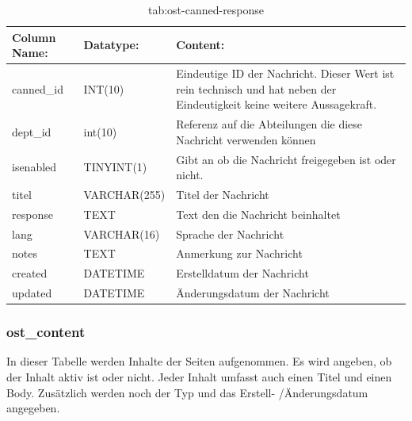 \begin{table}[h]
	\begin{tabular}{|p{3.5cm}|p{4cm}|p{6.2cm}|}
		\hline
		\textbf{Column Name:} & \textbf{Datatype:} & \textbf{Content:}\\
		\hline
		canned\_id & INT(10) & Eindeutige ID der Nachricht. Dieser Wert ist rein technisch und hat neben der Eindeutigkeit keine weitere 
		Aussagekraft.\\
		\hline
		dept\_id & int(10) & Referenz auf die Abteilungen die diese Nachricht verwenden können\\
		\hline
		isenabled & TINYINT(1) & Gibt an ob die Nachricht freigegeben ist oder nicht.\\
		\hline
		titel & VARCHAR(255) & Titel der Nachricht\\
		\hline
		response & TEXT & Text den die Nachricht beinhaltet\\
		\hline
		lang & VARCHAR(16) & Sprache der Nachricht\\
		\hline
		notes & TEXT & Anmerkung zur Nachricht\\
		\hline
		created & DATETIME & Erstelldatum der Nachricht\\
		\hline
		updated & DATETIME & Änderungsdatum der Nachricht\\
		\hline
	\end{tabular}
	\caption{tab:ost-canned-response}
\end{table}
\label{tab:ost_canned_response}

\newpage

\subsubsection{ost\_content}

In dieser Tabelle werden Inhalte der Seiten aufgenommen. Es wird angeben, ob der Inhalt aktiv ist oder nicht. Jeder Inhalt umfasst auch einen Titel und einen Body. Zusätzlich werden noch der Typ und das Erstell- /Änderungsdatum angegeben.

